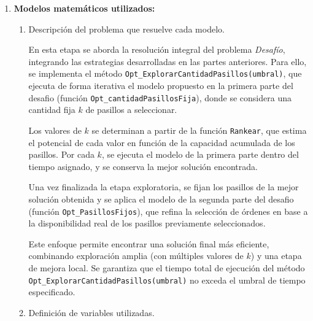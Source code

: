 \documentclass[a4paper,12pt]{article}
\begin{document}
\begin{enumerate}[label=(\alph*), leftmargin=2em]
    \item \textbf{Modelos matemáticos utilizados:}
    \begin{enumerate}[label=\roman*., leftmargin=0.2em]
        \item Descripción del problema que resuelve cada modelo.

            En esta etapa se aborda la resolución integral del problema \textit{Desafío}, integrando las estrategias desarrolladas en las partes anteriores. Para ello, se implementa el método \texttt{Opt\_ExplorarCantidadPasillos(umbral)}, que ejecuta de forma iterativa el modelo propuesto en la primera parte del desafio (función \texttt{Opt\_cantidadPasillosFija}), donde se considera una cantidad fija \(k\) de pasillos a seleccionar.
    
            Los valores de \(k\) se determinan a partir de la función \texttt{Rankear}, que estima el potencial de cada valor en función de la capacidad acumulada de los pasillos. Por cada \(k\), se ejecuta el modelo de la primera parte dentro del tiempo asignado, y se conserva la mejor solución encontrada.
            
            Una vez finalizada la etapa exploratoria, se fijan los pasillos de la mejor solución obtenida y se aplica el modelo de la segunda parte del desafio (función \texttt{Opt\_PasillosFijos}), que refina la selección de órdenes en base a la disponibilidad real de los pasillos previamente seleccionados.
            
            Este enfoque permite encontrar una solución final más eficiente, combinando exploración amplia (con múltiples valores de \(k\)) y una etapa de mejora local. Se garantiza que el tiempo total de ejecución del método \texttt{Opt\_ExplorarCantidadPasillos(umbral)} no exceda el umbral de tiempo especificado.
            
        \item Definición de variables utilizadas.


\end{enumerate}
\end{enumerate}
\end{document}

